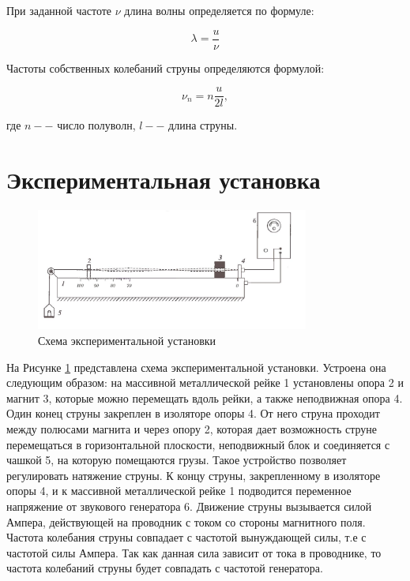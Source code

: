 \documentclass[12pt,a4paper]{article}
\begin{document}
При заданной частоте $\nu$ длина волны определяется по формуле:

\begin{equation}
	\lambda = \frac{u}{\nu}
\end{equation}

Частоты собственных колебаний струны определяются формулой:

\begin{equation}
	\nu_{n} = n\frac{u}{2l},
	\label{eq:frequency_velocity_equation}
\end{equation}

где $n -- $ число полуволн, $l -- $ длина струны.

\section{Экспериментальная установка}

\begin{figure}[h!]
	\begin{center}
		\includegraphics[width = 0.8\textwidth]{facility}
		\caption{Схема экспериментальной установки}
		\label{fig:facility}
	\end{center}
\end{figure}

На Рисунке \ref{fig:facility} представлена схема экспериментальной установки. Устроена она следующим образом: на массивной металлической рейке 1 установлены опора 2 и магнит 3, которые можно перемещать вдоль рейки, а также неподвижная опора 4. Один конец струны закреплен в изоляторе опоры 4. От него струна проходит между полюсами магнита и через опору 2, которая дает возможность струне перемещаться в горизонтальной плоскости, неподвижный блок и соединяется с чашкой 5, на которую помещаются грузы. Такое устройство позволяет регулировать натяжение струны.  К концу струны, закрепленному в изоляторе опоры 4, и к массивной металлической рейке 1 подводится переменное напряжение от звукового генератора 6. Движение струны вызывается силой Ампера, действующей на проводник с током со стороны магнитного поля. Частота колебания струны совпадает с частотой вынуждающей силы, т.е с частотой силы Ампера. Так как данная сила зависит от тока в проводнике, то частота колебаний струны будет совпадать с частотой генератора.
\end{document}
